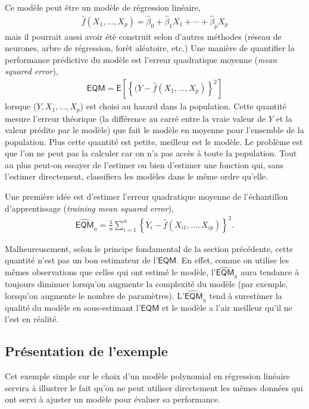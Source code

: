 \documentclass[
  11pt,
  letterpaper,
]{scrbook}
\theoremstyle{definition}
\theoremstyle{remark}
\begin{document}
Ce modèle peut être un modèle de régression linéaire, \begin{align*}
\widehat{f}(X_1, \ldots, X_p) = \widehat{\beta}_0 + \widehat{\beta}_1X_1 + \cdots + \widehat{\beta}_pX_p
\end{align*} mais il pourrait aussi avoir été construit selon d'autres
méthodes (réseau de neurones, arbre de régression, forêt aléatoire,
etc.) Une manière de quantifier la performance prédictive du modèle est
l'erreur quadratique moyenne (\emph{mean squared error}), \begin{align*}
\mathsf{EQM}=\mathsf{E}\left[\left\{(Y-\widehat{f}(X_1, \ldots, X_p)\right\}^2\right]
\end{align*} lorsque (\(Y, X_1, \ldots, X_p\)) est choisi au hasard dans
la population. Cette quantité mesure l'erreur théorique (la différence
au carré entre la vraie valeur de \(Y\) et la valeur prédite par le
modèle) que fait le modèle en moyenne pour l'ensemble de la population.
Plus cette quantité est petite, meilleur est le modèle. Le problème est
que l'on ne peut pas la calculer car on n'a pas accès à toute la
population. Tout au plus peut-on essayer de l'estimer ou bien d'estimer
une fonction qui, sans l'estimer directement, classifiera les modèles
dans le même ordre qu'elle.

Une première idée est d'estimer l'erreur quadratique moyenne de
l'échantillon d'apprentissage (\emph{training mean squared error}),
\begin{align*}
\widehat{\mathsf{EQM}}_a= \frac{1}{n}\sum_{i=1}^n \left\{Y_i-\widehat{f}(X_{i1}, \ldots, X_{ip})\right\}^2.
\end{align*}

Malheureusement, selon le principe fondamental de la section précédente,
cette quantité n'est pas un bon estimateur de l'\(\mathsf{EQM}\). En
effet, comme on utilise les mêmes observations que celles qui ont estimé
le modèle, l'\(\widehat{\mathsf{EQM}}_a\) aura tendance à toujours
diminuer lorsqu'on augmente la complexité du modèle (par exemple,
lorsqu'on augmente le nombre de paramètres).
L'\(\widehat{\mathsf{EQM}}_a\) tend à surestimer la qualité du modèle en
sous-estimant l'\(\mathsf{EQM}\) et le modèle a l'air meilleur qu'il ne
l'est en réalité.

\subsection{Présentation de
l'exemple}\label{pruxe9sentation-de-lexemple}

Cet exemple simple sur le choix d'un modèle polynomial en régression
linéaire servira à illustrer le fait qu'on ne peut utiliser directement
les mêmes données qui ont servi à ajuster un modèle pour évaluer sa
performance.
\end{document}
